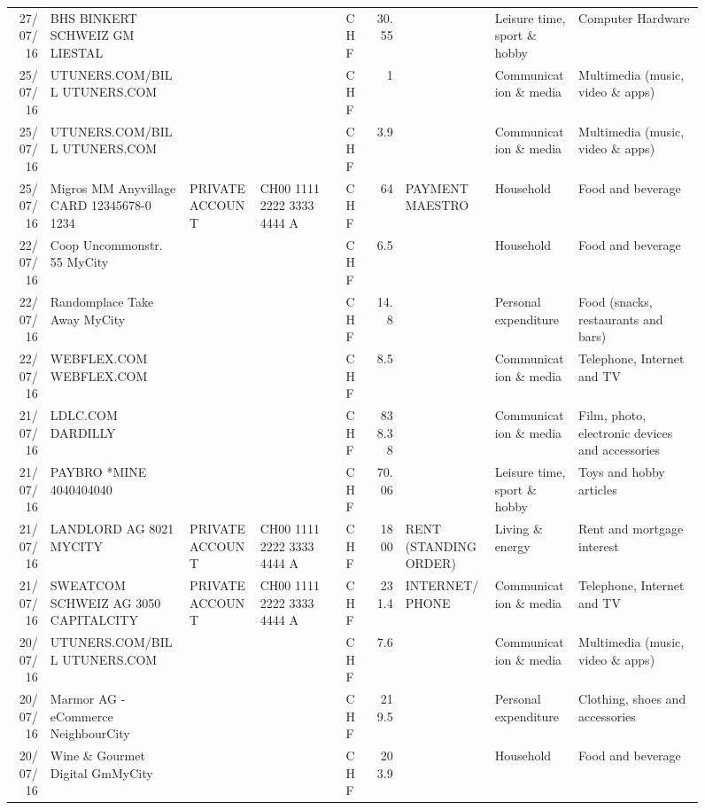 \begin{landscape}
\begin{sidewaysfigure}
\begin{table}[h]
\begin{center}
\begin{tabular}{rllllrlll}
		27/07/16 & BHS BINKERT SCHWEIZ GM   LIESTAL &       &       & CHF   & 30.55 &       & Leisure time, sport \& hobby & Computer Hardware \\
		25/07/16 & UTUNERS.COM/BILL          UTUNERS.COM &       &       & CHF   & 1     &       & Communication \& media & Multimedia (music, video \& apps) \\
		25/07/16 & UTUNERS.COM/BILL          UTUNERS.COM &       &       & CHF   & 3.9   &       & Communication \& media & Multimedia (music, video \& apps) \\
		25/07/16 & Migros MM Anyvillage CARD 12345678-0 1234 & PRIVATE ACCOUNT & CH00 1111 2222 3333 4444 A & CHF   & 64    & PAYMENT MAESTRO & Household & Food and beverage \\
		22/07/16 & Coop Uncommonstr. 55   MyCity &       &       & CHF   & 6.5   &       & Household & Food and beverage \\
		22/07/16 & Randomplace Take Away     MyCity &       &       & CHF   & 14.8  &       & Personal expenditure & Food (snacks, restaurants and bars) \\
		22/07/16 & WEBFLEX.COM              WEBFLEX.COM &       &       & CHF   & 8.5   &       & Communication \& media & Telephone,  Internet and TV \\
		21/07/16 & LDLC.COM                 DARDILLY &       &       & CHF   & 838.38 &       & Communication \& media & Film, photo, electronic devices and accessories \\
		21/07/16 & PAYBRO *MINE       4040404040 &       &       & CHF   & 70.06 &       & Leisure time, sport \& hobby & Toys and hobby articles \\
		21/07/16 & LANDLORD AG 8021 MYCITY & PRIVATE ACCOUNT & CH00 1111 2222 3333 4444 A & CHF   & 1800  & RENT (STANDING ORDER) & Living \& energy & Rent and mortgage interest \\
		21/07/16 & SWEATCOM SCHWEIZ AG 3050 CAPITALCITY & PRIVATE ACCOUNT & CH00 1111 2222 3333 4444 A & CHF   & 231.4 & INTERNET/PHONE & Communication \& media & Telephone,  Internet and TV \\
		20/07/16 & UTUNERS.COM/BILL          UTUNERS.COM &       &       & CHF   & 7.6   &       & Communication \& media & Multimedia (music, video \& apps) \\
		20/07/16 & Marmor AG - eCommerce     NeighbourCity &       &       & CHF   & 219.5 &       & Personal expenditure & Clothing, shoes and accessories \\
		20/07/16 & Wine \& Gourmet Digital GmMyCity &       &       & CHF   & 203.9 &       & Household & Food and beverage \\

\end{tabular}
\end{center}
\end{table}
\end{sidewaysfigure}
\end{landscape}
